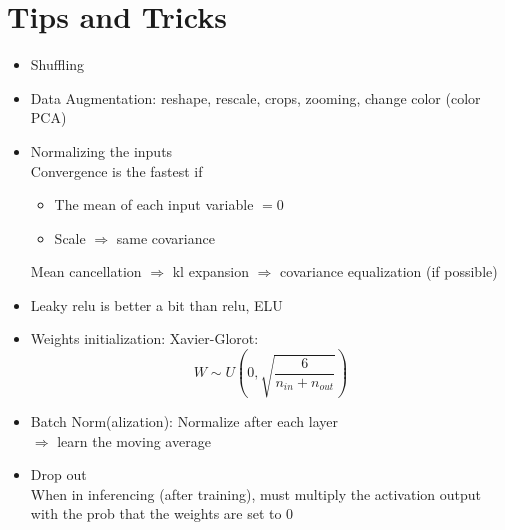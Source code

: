 \section{Tips and Tricks}

\begin{itemize}
	\item Shuffling
	\item Data Augmentation: reshape, rescale, crops, zooming, change color (color \ac{PCA})
	\item Normalizing the inputs\\
	Convergence is the fastest if
	\begin{itemize}
		\item The mean of each input variable $=0$
		\item Scale $\Rightarrow$ same covariance
	\end{itemize}
	Mean cancellation $\Rightarrow$ \ac{kl} expansion $\Rightarrow$ covariance equalization (if possible)
	\item Leaky \ac{relu} is better a bit than \ac{relu}, ELU
	\item Weights initialization: Xavier-Glorot:
	\[ W \sim U\left(0, \sqrt{\frac{6}{n_{in} + n_{out}}}\right) \]
	\item Batch Norm(alization): Normalize after each layer\\
	$\Rightarrow$ learn the moving average
	\item Drop out\\
	\note When in inferencing (after training), must multiply the activation output with the \ac{prob} that the weights are set to 0
\end{itemize}